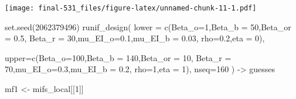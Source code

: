 \documentclass[
]{article}
\newenvironment{Shaded}{\begin{snugshade}}{\end{snugshade}}
\newcommand{\AttributeTok}[1]{\textcolor[rgb]{0.77,0.63,0.00}{#1}}
\newcommand{\DecValTok}[1]{\textcolor[rgb]{0.00,0.00,0.81}{#1}}
\newcommand{\FloatTok}[1]{\textcolor[rgb]{0.00,0.00,0.81}{#1}}
\newcommand{\FunctionTok}[1]{\textcolor[rgb]{0.00,0.00,0.00}{#1}}
\newcommand{\NormalTok}[1]{#1}
\newcommand{\OtherTok}[1]{\textcolor[rgb]{0.56,0.35,0.01}{#1}}
\begin{document}
\texttt{[image: final-531\_files/figure-latex/unnamed-chunk-11-1.pdf]}

\begin{Shaded}
\begin{Highlighting}[]
\FunctionTok{set.seed}\NormalTok{(}\DecValTok{2062379496}\NormalTok{)}
\FunctionTok{runif\_design}\NormalTok{(}
\AttributeTok{lower =} \FunctionTok{c}\NormalTok{(}\AttributeTok{Beta\_o=}\DecValTok{1}\NormalTok{,}\AttributeTok{Beta\_b =} \DecValTok{50}\NormalTok{,}\AttributeTok{Beta\_or =} \FloatTok{0.5}\NormalTok{, }
                    \AttributeTok{Beta\_r =} \DecValTok{30}\NormalTok{,}\AttributeTok{mu\_EI\_o=}\FloatTok{0.1}\NormalTok{,}\AttributeTok{mu\_EI\_b =} \FloatTok{0.03}\NormalTok{,}
             \AttributeTok{rho=}\FloatTok{0.2}\NormalTok{,}\AttributeTok{eta =} \DecValTok{0}\NormalTok{),}

\AttributeTok{upper=}\FunctionTok{c}\NormalTok{(}\AttributeTok{Beta\_o=}\DecValTok{100}\NormalTok{,}\AttributeTok{Beta\_b =} \DecValTok{140}\NormalTok{,}\AttributeTok{Beta\_or =} \DecValTok{10}\NormalTok{, }
                    \AttributeTok{Beta\_r =} \DecValTok{70}\NormalTok{,}\AttributeTok{mu\_EI\_o=}\FloatTok{0.3}\NormalTok{,}\AttributeTok{mu\_EI\_b =} \FloatTok{0.2}\NormalTok{,}
             \AttributeTok{rho=}\DecValTok{1}\NormalTok{,}\AttributeTok{eta =} \DecValTok{1}\NormalTok{),}
\AttributeTok{nseq=}\DecValTok{160}
\NormalTok{) }\OtherTok{{-}\textgreater{}}\NormalTok{ guesses}
\end{Highlighting}
\end{Shaded}

\begin{Shaded}
\begin{Highlighting}[]
\NormalTok{mf1 }\OtherTok{\textless{}{-}}\NormalTok{ mifs\_local[[}\DecValTok{1}\NormalTok{]]}
\end{Highlighting}
\end{Shaded}
\end{document}

